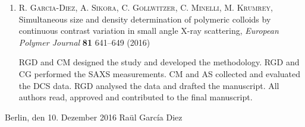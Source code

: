 \begin{enumerate}
    \item \textsc{R. Garcia-Diez, A. Sikora, C. Gollwitzer, C. Minelli, M. Krumrey}, Simultaneous size and density determination of polymeric colloids by continuous contrast variation in small angle {{X}}-ray scattering, \emph{European Polymer Journal} \textbf{81} 641–649 (2016) 

        \hspace{10pt} RGD and CM designed the study and developed the methodology. RGD and CG performed the SAXS measurements. CM and AS collected and evaluated the DCS data. RGD analysed the data and drafted the manuscript. All authors read, approved and contributed to the final manuscript.

\end{enumerate}

\vspace{3cm}

\noindent Berlin, den 10. Dezember 2016 \hfill Raül Garc\'{i}a Diez

\cleardoublepage
